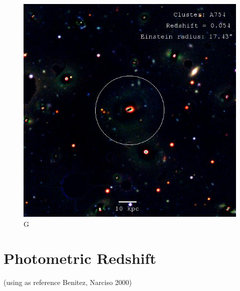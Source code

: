 \begin{figure}[H]
\centering
\includegraphics[width=12cm]{images/cA754_galfit.jpg}
\caption[M]{G}
\end{figure}


\section{Photometric Redshift}

(using as reference Benitez, Narciso 2000)